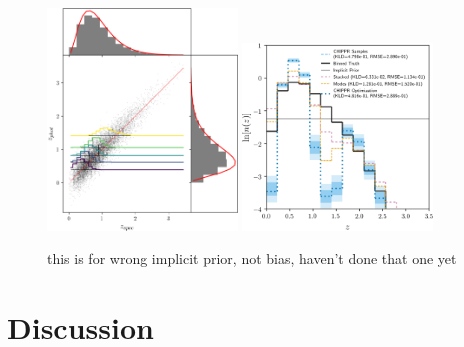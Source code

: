 \documentclass[iop]{emulateapj}
\begin{document}
\begin{figure}
	\begin{center}
		\includegraphics[width=0.45\textwidth]{fig/wrong_scatter.png}
		\includegraphics[width=0.45\textwidth]{fig/wrong_log_estimators.png}
		\caption{this is for wrong implicit prior, not bias, haven't done that one yet}
		\label{fig:mischaracterized}
	\end{center}
\end{figure}

\section{Discussion}
\label{sec:discussion}
\end{document}
